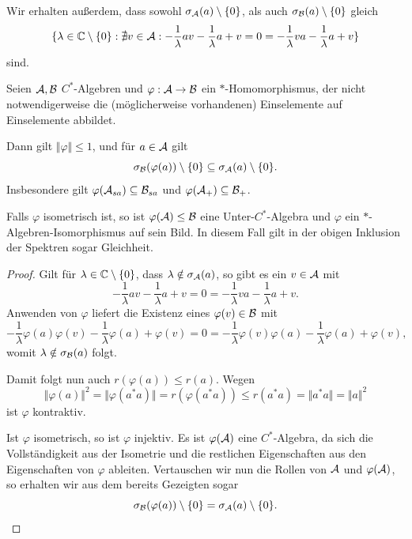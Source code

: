 Wir erhalten außerdem, dass sowohl $\sigma_{\mathcal{A}}(a) \setminus \{0\}$, als auch $\sigma_{\mathcal{B}}(a) \setminus \{0\}$ gleich
\[
     \{ \lambda \in \mathbb{C} \setminus \{0\} : \nexists v \in \mathcal{A}: -\frac{1}{\lambda} a v - \frac{1}{\lambda} a + v = 0 = -\frac{1}{\lambda} v a - \frac{1}{\lambda} a + v \}
\]
sind.

\begin{corollary}
    Seien $\mathcal{A}, \mathcal{B}$ $C^*$-Algebren und $\varphi : \mathcal{A} \to \mathcal{B}$ ein $\ast$-Homomorphismus, der nicht notwendigerweise die (möglicherweise vorhandenen) Einselemente auf Einselemente abbildet.

    Dann gilt $\Vert \varphi \Vert \leq 1$, und für $a \in \mathcal{A}$ gilt
    \[
        \sigma_{\mathcal{B}} (\varphi(a)) \setminus \{0\} \subseteq \sigma_{\mathcal{A}} (a) \setminus \{0\}.
    \]
    Insbesondere gilt $\varphi(\mathcal{A}_{sa}) \subseteq \mathcal{B}_{sa}$ und $\varphi(\mathcal{A}_{+}) \subseteq \mathcal{B}_{+}$.

    Falls $\varphi$ isometrisch ist, so ist $\varphi(\mathcal{A}) \leq \mathcal{B}$ eine Unter-$C^*$-Algebra und $\varphi$ ein $\ast$-Algebren-Isomorphismus auf sein Bild. In diesem Fall gilt in der obigen Inklusion der Spektren sogar Gleichheit.
\end{corollary}

\begin{proof}
    Gilt für $\lambda \in \mathbb{C} \setminus \{0\}$, dass $\lambda \notin \sigma_{\mathcal{A}} (a)$, so gibt es ein $v \in \mathcal{A}$ mit
    $$ -\frac{1}{\lambda} a v - \frac{1}{\lambda} a + v = 0 = -\frac{1}{\lambda} v a - \frac{1}{\lambda} a + v. $$
    Anwenden von $\varphi$ liefert die Existenz eines $\varphi(v) \in \mathcal{B}$ mit
    \[
        -\frac{1}{\lambda} \varphi(a) \varphi(v) - \frac{1}{\lambda} \varphi(a) + \varphi(v) = 0 = -\frac{1}{\lambda} \varphi(v) \varphi(a) - \frac{1}{\lambda} \varphi(a) + \varphi(v), 
    \]
    womit $\lambda \notin \sigma_{\mathcal{B}} (a)$ folgt.

    Damit folgt nun auch $r(\varphi(a)) \leq r(a)$. Wegen
    \[ 
        \Vert \varphi(a) \Vert^2 = \Vert \varphi(a^* a) \Vert = r(\varphi(a^* a)) \leq r(a^* a) = \Vert a^* a \Vert = \Vert a \Vert^2
    \]
    ist $\varphi$ kontraktiv.

    Ist $\varphi$ isometrisch, so ist $\varphi$ injektiv. Es ist $\varphi(\mathcal{A})$ eine $C^*$-Algebra, da sich die Vollständigkeit aus der Isometrie und die restlichen Eigenschaften aus den Eigenschaften von $\varphi$ ableiten. Vertauschen wir nun die Rollen von $\mathcal{A}$ und $\varphi(\mathcal{A})$, so erhalten wir aus dem bereits Gezeigten sogar
    \[
        \sigma_{\mathcal{B}} (\varphi(a)) \setminus \{0\} = \sigma_{\mathcal{A}} (a) \setminus \{0\}. \qedhere
    \]
\end{proof}

